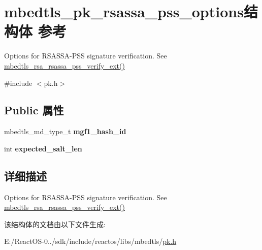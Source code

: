 \hypertarget{structmbedtls__pk__rsassa__pss__options}{}\section{mbedtls\+\_\+pk\+\_\+rsassa\+\_\+pss\+\_\+options结构体 参考}
\label{structmbedtls__pk__rsassa__pss__options}


Options for R\+S\+A\+S\+S\+A-\/\+P\+SS signature verification. See {\ttfamily \hyperlink{rsa_8h_ac7791a1e03b00651a844dc6f5f32aaaa}{mbedtls\+\_\+rsa\+\_\+rsassa\+\_\+pss\+\_\+verify\+\_\+ext()}}  




{\ttfamily \#include $<$pk.\+h$>$}

\subsection*{Public 属性}
\begin{DoxyCompactItemize}
\item 
\mbox{\label{structmbedtls__pk__rsassa__pss__options_ab5ca5b88636ad6db1af4a67ddf748606}} 
mbedtls\+\_\+md\+\_\+type\+\_\+t {\bfseries mgf1\+\_\+hash\+\_\+id}
\item 
\mbox{\label{structmbedtls__pk__rsassa__pss__options_a7d820886502754155458ba3d846f577d}} 
int {\bfseries expected\+\_\+salt\+\_\+len}
\end{DoxyCompactItemize}


\subsection{详细描述}
Options for R\+S\+A\+S\+S\+A-\/\+P\+SS signature verification. See {\ttfamily \hyperlink{rsa_8h_ac7791a1e03b00651a844dc6f5f32aaaa}{mbedtls\+\_\+rsa\+\_\+rsassa\+\_\+pss\+\_\+verify\+\_\+ext()}} 

该结构体的文档由以下文件生成\+:\begin{DoxyCompactItemize}
\item 
E\+:/\+React\+O\+S-\/0../sdk/include/reactos/libs/mbedtls/\hyperlink{pk_8h}{pk.\+h}\end{DoxyCompactItemize}
